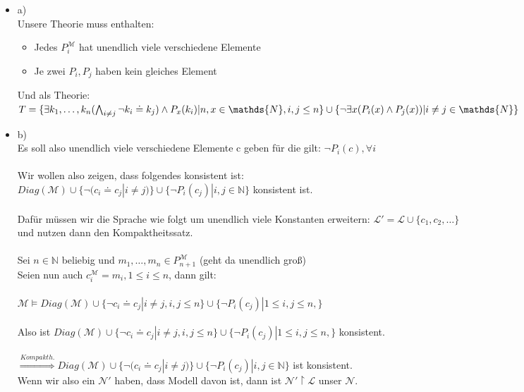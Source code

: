 \documentclass[a4paper]{scrartcl}%
\begin{document}
    \begin{itemize}
        \item a)\\
            Unsere Theorie muss enthalten:\\%
            \begin{itemize}
                \item Jedes $P_i^\mathcal{M}$ hat unendlich viele verschiedene Elemente\\
                \item Je zwei $P_i, P_j$ haben kein gleiches Element\\
            \end{itemize}
            Und als Theorie:\\
            $T = \{\exists k_1,\dots,k_n(\bigwedge_{i \neq j} \neg k_i \doteq k_j) \land P_x(k_i)| n,x \in \mathds{N}, i,j\leq n\}\\
            \cup \{\neg \exists x (P_i(x) \land P_j(x)) | i \neq j \in \mathds{N}\}$\\%
        \item b)\\
            Es soll also unendlich viele verschiedene Elemente c geben für die gilt: $\neg P_i(c), \forall i$\\%
            \\Wir wollen also zeigen, dass folgendes konsistent ist:\\
            $Diag(\mathcal{M}) \cup \{\neg (c_i \doteq c_j | i \neq j)\} \cup \{\neg P_i(c_j) | i,j\in \mathds{N}\}$ konsistent ist.\\
            \\Dafür müssen wir die Sprache wie folgt um unendlich viele Konstanten erweitern: $ \mathscr{L}' = \mathscr{L} \cup \{c_1,c_2,\dots\}$\\
            und nutzen dann den Kompaktheitssatz.\\
            \\Sei $n \in \mathds{N}$ beliebig und $m_1,\dots,m_n \in P_{n+1}^\mathcal{M}$ (geht da unendlich groß)\\
            Seien nun auch $c_i^\mathcal{M} = m_i, 1 \leq i \leq n$, dann gilt:\\
            \\$\mathcal{M} \vDash Diag(\mathcal{M}) \cup \{\neg c_i \doteq c_j |i\neq j, i,j\leq n\} \cup \{\neg P_i(c_j) | 1\leq i,j \leq n,\}$\\
            \\Also ist $Diag(\mathcal{M}) \cup \{\neg c_i \doteq c_j |i\neq j, i,j\leq n\} \cup \{\neg P_i(c_j) | 1\leq i,j \leq n,\}$ konsistent.\\
            \\$\overset{Kompakth.}{\Rightarrow} Diag(\mathcal{M}) \cup \{\neg (c_i \doteq c_j | i \neq j)\} \cup \{\neg P_i(c_j) | i,j\in \mathds{N}\}$ ist konsistent.\\
            Wenn wir also ein $\mathcal{N}'$ haben, dass Modell davon ist, dann ist $\mathcal{N}'\upharpoonright \mathscr{L}$ unser $\mathcal{N}$.\\%


\end{itemize}
\end{document}
